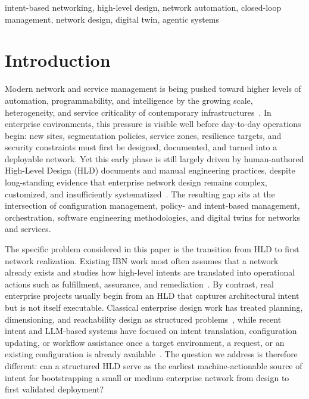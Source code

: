 \documentclass[conference]{IEEEtran}
\begin{document}
\begin{IEEEkeywords}
intent-based networking, high-level design, network automation, closed-loop management, network design, digital twin, agentic systems
\end{IEEEkeywords}

\section{Introduction}

Modern network and service management is being pushed toward higher levels of automation, programmability, and intelligence by the growing scale, heterogeneity, and service criticality of contemporary infrastructures~\cite{clemm2020network}. In enterprise environments, this pressure is visible well before day-to-day operations begin: new sites, segmentation policies, service zones, resilience targets, and security constraints must first be designed, documented, and turned into a deployable network. Yet this early phase is still largely driven by human-authored High-Level Design (HLD) documents and manual engineering practices, despite long-standing evidence that enterprise network design remains complex, customized, and insufficiently systematized~\cite{drakopoulos1999enterprise,sung2008towards}. The resulting gap sits at the intersection of configuration management, policy- and intent-based management, orchestration, software engineering methodologies, and digital twins for networks and services.

The specific problem considered in this paper is the transition from HLD to first network realization. Existing IBN work most often assumes that a network already exists and studies how high-level intents are translated into operational actions such as fulfillment, assurance, and remediation~\cite{rfc9315}. By contrast, real enterprise projects usually begin from an HLD that captures architectural intent but is not itself executable. Classical enterprise design work has treated planning, dimensioning, and reachability design as structured problems~\cite{drakopoulos1999enterprise,sung2008towards}, while recent intent and LLM-based systems have focused on intent translation, configuration updating, or workflow assistance once a target environment, a request, or an existing configuration is already available~\cite{paul2025swift,han2025networkcopilot,wang2024netconfeval}. The question we address is therefore different: can a structured HLD serve as the earliest machine-actionable source of intent for bootstrapping a small or medium enterprise network from design to first validated deployment?
\end{document}
